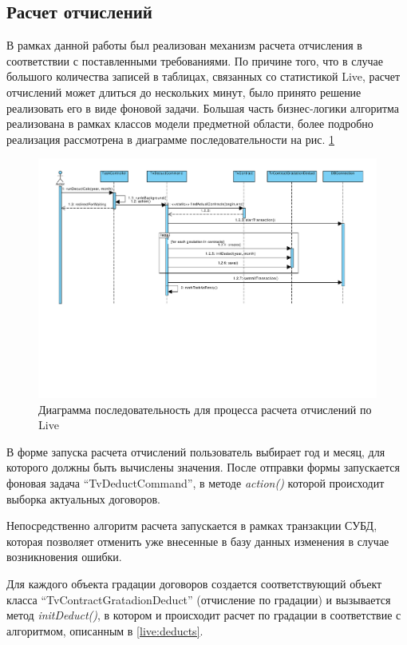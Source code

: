 \subsection{Расчет отчислений}
В рамках данной работы был реализован механизм расчета отчисления в соответствии с поставленными требованиями.
По причине того, что в случае большого количества записей в таблицах, связанных со статистикой Live, расчет отчислений
может длиться до нескольких минут, было принято решение реализовать его в виде фоновой задачи.
Большая часть бизнес-логики алгоритма реализована в рамках классов модели предметной области, более подробно реализация
рассмотрена в диаграмме последовательности на рис. \ref{gr:calc_deduct}

\begin{figure}[!ht]
\begin{center}
\vspace{-0.4cm}
\includegraphics[scale=0.65, trim=10mm 80mm 0mm 10mm, clip]{../resources/uml/CalcDeduct.pdf}
\caption{Диаграмма последовательность для процесса расчета отчислений по Live}
\label{gr:calc_deduct}
\end{center} 
\end{figure}

В форме запуска расчета отчислений пользователь выбирает год и месяц, для которого
должны быть вычислены значения. После отправки формы запускается фоновая задача ``TvDeductCommand'',
в методе \textit{action()} которой происходит выборка актуальных договоров.

Непосредственно алгоритм расчета запускается в рамках транзакции СУБД, которая позволяет отменить уже внесенные 
в базу данных изменения в случае возникновения ошибки.

Для каждого объекта градации договоров создается соответствующий объект класса ``TvContractGratadionDeduct''
(отчисление по градации) и вызывается метод \textit{initDeduct()}, в котором и происходит расчет по градации
в соответствие с алгоритмом, описанным в \ref{live:deducts}.
